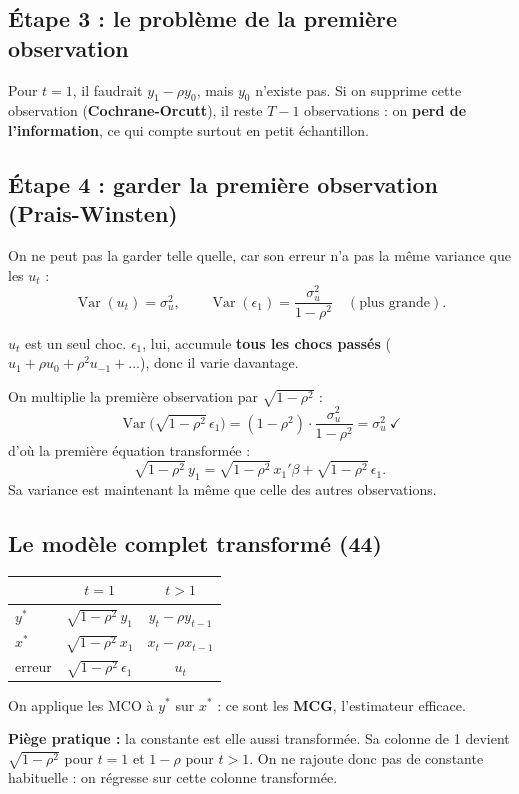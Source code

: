 \documentclass[12pt,a4paper]{article}
\newcommand{\Var}{\operatorname{Var}}\newcommand{\Cov}{\operatorname{Cov}}\newcommand{\E}{\mathbb{E}}
\begin{document}
\subsection*{Étape 3 : le problème de la première observation}
Pour $t=1$, il faudrait $y_1-\rho y_0$, mais $y_0$ n'existe pas. Si on supprime cette observation (\textbf{Cochrane-Orcutt}), il reste $T-1$ observations : on \textbf{perd de l'information}, ce qui compte surtout en petit échantillon.

\subsection*{Étape 4 : garder la première observation (Prais-Winsten)}
On ne peut pas la garder telle quelle, car son erreur n'a pas la même variance que les $u_t$ :
\[
\Var(u_t)=\sigma_u^2,\qquad \Var(\epsilon_1)=\frac{\sigma_u^2}{1-\rho^2}\quad(\text{plus grande}).
\]
\begin{intuition}
$u_t$ est un seul choc. $\epsilon_1$, lui, accumule \textbf{tous les chocs passés} ($u_1+\rho u_0+\rho^2u_{-1}+\dots$), donc il varie davantage.
\end{intuition}
On multiplie la première observation par $\sqrt{1-\rho^2}$ :
\[
\Var\big(\sqrt{1-\rho^2}\,\epsilon_1\big)=(1-\rho^2)\cdot\frac{\sigma_u^2}{1-\rho^2}=\sigma_u^2\ \checkmark
\]
d'où la première équation transformée :
\[
\sqrt{1-\rho^2}\,y_1=\sqrt{1-\rho^2}\,x_1'\beta+\sqrt{1-\rho^2}\,\epsilon_1 .
\]
Sa variance est maintenant la même que celle des autres observations.

\subsection*{Le modèle complet transformé (44)}
\begin{center}
\renewcommand{\arraystretch}{1.4}
\begin{tabular}{@{}lcc@{}}
\toprule
& $t=1$ & $t>1$ \\
\midrule
$y^*$ & $\sqrt{1-\rho^2}\,y_1$ & $y_t-\rho y_{t-1}$ \\
$x^*$ & $\sqrt{1-\rho^2}\,x_1$ & $x_t-\rho x_{t-1}$ \\
erreur & $\sqrt{1-\rho^2}\,\epsilon_1$ & $u_t$ \\
\bottomrule
\end{tabular}
\end{center}
On applique les MCO à $y^*$ sur $x^*$ : ce sont les \textbf{MCG}, l'estimateur efficace.

\textbf{Piège pratique :} la constante est elle aussi transformée. Sa colonne de 1 devient $\sqrt{1-\rho^2}$ pour $t=1$ et $1-\rho$ pour $t>1$. On ne rajoute donc pas de constante habituelle : on régresse sur cette colonne transformée.
\end{document}
